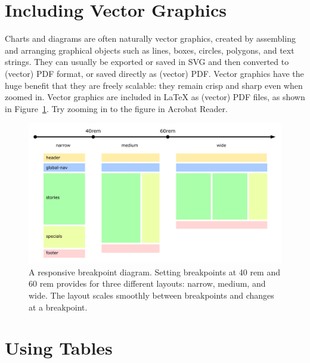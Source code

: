 \section{Including Vector Graphics}

Charts and diagrams are often naturally vector graphics, created by
assembling and arranging graphical objects such as lines, boxes,
circles, polygons, and text strings. They can usually be exported or
saved in SVG and then converted to (vector) PDF format, or saved
directly as (vector) PDF. Vector graphics have the huge benefit that
they are freely scalable: they remain crisp and sharp even when zoomed
in.
%
Vector graphics are included in LaTeX as (vector) PDF files, as shown
in Figure~\ref{fig:BreakpointDiagram}. Try zooming in to the figure in
Acrobat Reader.



\begin{figure}[tp]
\centering
\includegraphics[frame,keepaspectratio,width=\linewidth,height=\halfh]
{diagrams/breakpoint.pdf}

\caption[Responsive Breakpoint Diagram]
{
A responsive breakpoint diagram. Setting breakpoints at 40 rem and 60 rem
provides for three different layouts: narrow, medium, and wide.
The layout scales smoothly between breakpoints and changes at a breakpoint.
}
\label{fig:BreakpointDiagram}
\end{figure}









\section{Using Tables}

